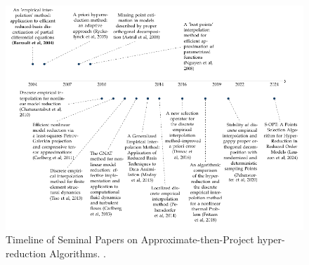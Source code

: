 \documentclass[11pt]{article}
\begin{document}
\begin{figure}
\centering
\includegraphics[width=\textwidth]{ATP.pdf}
\caption{Timeline of Seminal Papers on Approximate-then-Project hyper-reduction Algorithms. \cite{barrault2004empirical,ryckelynck2005priori,nguyen2007best,astrid2008missing,chaturantabut2010nonlinear,carlberg2011efficient,tiso2013discrete,carlberg2013gnat,peherstorfer2014localized,drmac2016new,peherstorfer2020stability,lauzon2024s-opt,Fritzen_2018,Maday_2013}.}
\label{fig:ATP_LIT}
\end{figure}
\end{document}
